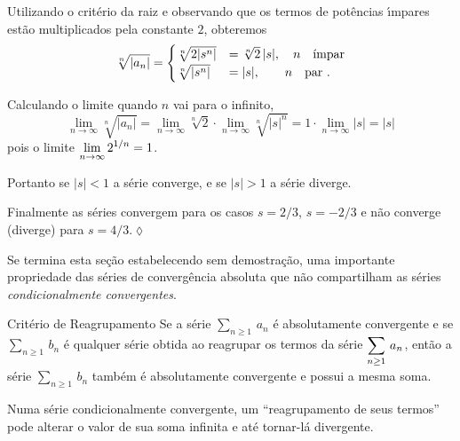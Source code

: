 \solo Utilizando o crit\'{e}rio da raiz e observando que os termos de
pot\^{e}ncias \'{\i}mpares est\~{a}o multiplicados pela constante $2$, obteremos
\begin{equation*}
  \sqrt[n]{|a_n|}=
  \begin{cases}
    \sqrt[n]{2|s^n|} &=\sqrt[n]{2}\,|s|,\quad n\quad\text{\'{\i}mpar} \\
    \sqrt[n]{|s^n|} &=|s|,\qquad n\quad \text{par }.
  \end{cases}
\end{equation*}

Calculando o limite quando $n$ vai para o infinito,
\begin{equation*}
\lim_{n\to\infty}\sqrt[n]{|a_n|}=\lim_{n\to\infty}\sqrt[n]{2}\cdot
\lim_{n\to\infty}\sqrt[n]{|s|^n}=1\cdot\lim_{n\to\infty}|s|=|s|
\end{equation*}
pois o limite $\displaystyle{\lim_{n\to\infty}2^{1/n}=1}$.

Portanto se $|s|<1$ a s\'{e}rie converge, e se $|s|>1$ a s\'{e}rie diverge.

Finalmente as s\'{e}ries convergem para os casos $s=2/3$, $s=-2/3$ e
n\~{a}o converge (diverge) para $s=4/3$.\hfill \(\lozenge\)

Se termina esta se\c{c}\~{a}o estabelecendo sem demostra\c{c}\~{a}o, uma
importante propriedade das s\'{e}ries de converg\^{e}ncia absoluta que n\~{a}o
compartilham as s\'{e}ries \textit{condicionalmente convergentes}.

\begin{theoc}{Crit\'{e}rio de Reagrupamento}{}
Se a s\'{e}rie $\sum_{n\geq1}\,a_{n}$ \'{e} absolutamente convergente
e se $\sum_{n\geq 1}\,b_{n}$ \'{e} qualquer s\'{e}rie obtida ao
reagrupar os termos da s\'{e}rie $\displaystyle{\sum_{n\geq1}\,a_n}$, ent\~{a}o a
s\'{e}rie $\sum_{n\geq1}\,b_{n}$ tamb\'{e}m \'{e} absolutamente
convergente e possui a mesma soma.
\end{theoc}

Numa série condicionalmente convergente, um ``reagrupamento de seus termos'' pode alterar o valor de sua 
soma infinita e até tornar-lá divergente. 

